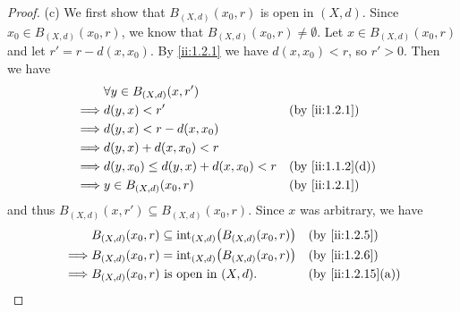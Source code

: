 \begin{proof}{(c)}
  We first show that \(B_{(X, d)}(x_0, r)\) is open in \((X, d)\).
  Since \(x_0 \in B_{(X, d)}(x_0, r)\), we know that \(B_{(X, d)}(x_0, r) \neq \emptyset\).
  Let \(x \in B_{(X, d)}(x_0, r)\) and let \(r' = r - d(x, x_0)\).
  By \cref{ii:1.2.1} we have \(d(x, x_0) < r\), so \(r' > 0\).
  Then we have
  \begin{align*}
             & \forall y \in B_{(X, d)}(x, r')                              \\
    \implies & d(y, x) < r'                           &  & \by{ii:1.2.1}    \\
    \implies & d(y, x) < r - d(x, x_0)                                      \\
    \implies & d(y, x) + d(x, x_0) < r                                      \\
    \implies & d(y, x_0) \leq d(y, x) + d(x, x_0) < r &  & \by{ii:1.1.2}[d] \\
    \implies & y \in B_{(X, d)}(x_0, r)               &  & \by{ii:1.2.1}
  \end{align*}
  and thus \(B_{(X, d)}(x, r') \subseteq B_{(X, d)}(x_0, r)\).
  Since \(x\) was arbitrary, we have
  \begin{align*}
             & B_{(X, d)}(x_0, r) \subseteq \text{int}_{(X, d)}\big(B_{(X, d)}(x_0, r)\big) &  & \by{ii:1.2.5}     \\
    \implies & B_{(X, d)}(x_0, r) = \text{int}_{(X, d)}\big(B_{(X, d)}(x_0, r)\big)         &  & \by{ii:1.2.6}     \\
    \implies & B_{(X, d)}(x_0, r) \text{ is open in } (X, d).                               &  & \by{ii:1.2.15}[a]
  \end{align*}


\end{proof}
